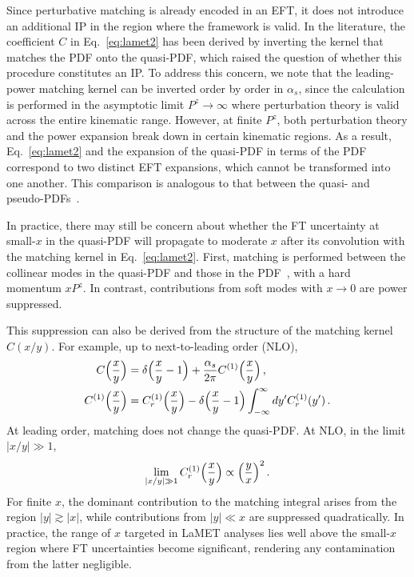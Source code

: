 \documentclass[prd,twocolumn,superscriptaddress,preprintnumbers,showpacs,nofootinbib,notitlepage,floatfix]{revtex4-2}
\DeclareRobustCommand{\eq}[1]{Eq.~\eqref{eq:#1}}
\DeclareRobustCommand{\eq}[1]{Eq.~(\ref{eq:#1})}
\begin{document}
Since perturbative matching is already encoded in an EFT, it does not introduce an additional IP in the region where the framework is valid. In the literature, the coefficient $C$ in \eq{lamet2} has been derived by inverting the kernel that matches the PDF onto the quasi-PDF\cite{Xiong:2013bka,Izubuchi:2018srq}, which raised the question of whether this procedure constitutes an IP. To address this concern, we note that the leading-power matching kernel can be inverted order by order in $\alpha_s$, since the calculation is performed in the asymptotic limit $P^z \to \infty$ where perturbation theory is valid across the entire kinematic range. However, at finite $P^z$, both perturbation theory and the power expansion break down in certain kinematic regions. As a result, \eq{lamet2} and the expansion of the quasi-PDF in terms of the PDF correspond to two distinct EFT expansions, which cannot be transformed into one another. This comparison is analogous to that between the quasi- and pseudo-PDFs~\cite{Ji:2020brr,Ji:2020ect,Ji:2020byp,Ji:2022ezo,Ji:2024oka}.

In practice, there may still be concern about whether the FT uncertainty at small-$x$ in the quasi-PDF will propagate to moderate $x$ after its convolution with the matching kernel in \eq{lamet2}. First, matching is performed between the collinear modes in the quasi-PDF and those in the PDF~\cite{Ji:2020ect,Ji:2020byp,Ji:2022ezo,Ji:2024oka}, with a hard momentum $xP^z$. In contrast, contributions from soft modes with $x\to0$ are power suppressed. 

This suppression can also be derived from the structure of the matching kernel $C(x/y)$. For example, up to next-to-leading order (NLO),
\begin{align}
    C\Big({x\over y}\Big) &= \delta \Big({x\over y}-1\Big) + {\alpha_s \over 2\pi} C^{(1)}\Big({x\over y}\Big)\,,\\
    C^{(1)}\Big({x\over y}\Big) &= C^{(1)}_r\Big({x\over y}\Big) - \delta\Big({x\over y}-1\Big) \int_{-\infty}^\infty dy' C^{(1)}_r(y')\,.
\end{align}
At leading order, matching does not change the quasi-PDF. At NLO, in the limit $|x/y|\gg1$,
\begin{align}
    \lim_{|x/y|\gg1}C^{(1)}_r\Big({x\over y}\Big) \propto \Big({y\over x}\Big)^2\,.
\end{align}
For finite $x$, the dominant contribution to the matching integral arises from the region $|y| \gtrsim |x|$, while contributions from $|y| \ll x$ are suppressed quadratically. 
In practice, the range of $x$ targeted in LaMET analyses lies well above the small-$x$ region where FT uncertainties become significant, rendering any contamination from the latter negligible.
\end{document}
